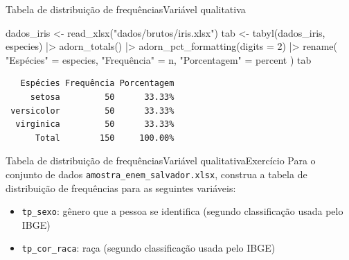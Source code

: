 \documentclass[
  10pt,
  ignorenonframetext,
]{beamer}
\newenvironment{Shaded}{\begin{snugshade}}{\end{snugshade}}
\newcommand{\AttributeTok}[1]{\textcolor[rgb]{0.40,0.45,0.13}{#1}}
\newcommand{\DecValTok}[1]{\textcolor[rgb]{0.68,0.00,0.00}{#1}}
\newcommand{\FunctionTok}[1]{\textcolor[rgb]{0.28,0.35,0.67}{#1}}
\newcommand{\NormalTok}[1]{\textcolor[rgb]{0.00,0.23,0.31}{#1}}
\newcommand{\OtherTok}[1]{\textcolor[rgb]{0.00,0.23,0.31}{#1}}
\newcommand{\SpecialCharTok}[1]{\textcolor[rgb]{0.37,0.37,0.37}{#1}}
\newcommand{\StringTok}[1]{\textcolor[rgb]{0.13,0.47,0.30}{#1}}
\providecommand{\tightlist}{%
  \setlength{\itemsep}{0pt}\setlength{\parskip}{0pt}}\usepackage{longtable,booktabs,array}
\begin{document}
\begin{frame}[fragile]{Tabela de distribuição de
frequências\newline Variável qualitativa}
\protect\hypertarget{tabela-de-distribuiuxe7uxe3o-de-frequuxeanciasvariuxe1vel-qualitativa-1}{}
\begin{Shaded}
\begin{Highlighting}[]
\NormalTok{dados\_iris }\OtherTok{\textless{}{-}} \FunctionTok{read\_xlsx}\NormalTok{(}\StringTok{"dados/brutos/iris.xlsx"}\NormalTok{)}
\NormalTok{tab }\OtherTok{\textless{}{-}} \FunctionTok{tabyl}\NormalTok{(dados\_iris, especies)  }\SpecialCharTok{|\textgreater{}}
  \FunctionTok{adorn\_totals}\NormalTok{()  }\SpecialCharTok{|\textgreater{}}
  \FunctionTok{adorn\_pct\_formatting}\NormalTok{(}\AttributeTok{digits =} \DecValTok{2}\NormalTok{) }\SpecialCharTok{|\textgreater{}}
  \FunctionTok{rename}\NormalTok{(}
    \StringTok{"Espécies"} \OtherTok{=}\NormalTok{ especies, }\StringTok{"Frequência"} \OtherTok{=}\NormalTok{ n,}
    \StringTok{"Porcentagem"} \OtherTok{=}\NormalTok{ percent}
\NormalTok{  )}
\NormalTok{tab}
\end{Highlighting}
\end{Shaded}

\begin{verbatim}
   Espécies Frequência Porcentagem
     setosa         50      33.33%
 versicolor         50      33.33%
  virginica         50      33.33%
      Total        150     100.00%
\end{verbatim}
\end{frame}

\begin{frame}[fragile]{Tabela de distribuição de
frequências\newline Variável qualitativa\newline Exercício}
\protect\hypertarget{tabela-de-distribuiuxe7uxe3o-de-frequuxeanciasvariuxe1vel-qualitativaexercuxedcio}{}
Para o conjunto de dados \texttt{amostra\_enem\_salvador.xlsx}, construa
a tabela de distribuição de frequências para as seguintes variáveis:

\begin{itemize}
\tightlist
\item
  \texttt{tp\_sexo}: gênero que a pessoa se identifica (segundo
  classificação usada pelo IBGE)
\item
  \texttt{tp\_cor\_raca}: raça (segundo classificação usada pelo IBGE)
\end{itemize}
\end{frame}
\end{document}
